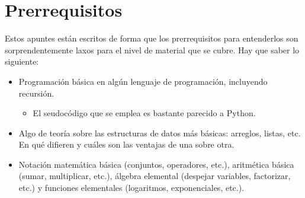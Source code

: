 \section{Prerrequisitos}

Estos apuntes están escritos de forma que los prerrequisitos para entenderlos son sorprendentemente laxos para el nivel de material que se cubre. Hay que saber lo siguiente:
\begin{itemize}
  \item Programación básica en algún lenguaje de programación, incluyendo recursión. 
  \begin{itemize}
    \item El seudocódigo que se emplea es bastante parecido a Python.
  \end{itemize}
  \item Algo de teoría sobre las estructuras de datos más básicas: arreglos, listas, etc. En qué difieren y cuáles son las ventajas de una sobre otra.
  \item Notación matemática básica (conjuntos, operadores, etc.), aritmética básica (sumar, multiplicar, etc.), álgebra elemental (despejar variables, factorizar, etc.) y funciones elementales (logaritmos, exponenciales, etc.).
\end{itemize}

